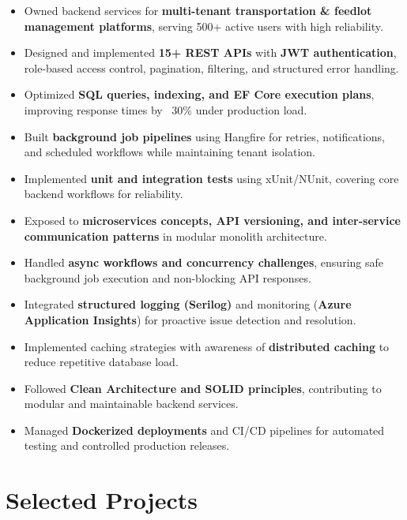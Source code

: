 \documentclass[a4paper,10pt]{article}
\newcommand{\resumeItem}[1]{\item #1}
\begin{document}
\begin{itemize}
    \resumeItem{Owned backend services for \textbf{multi-tenant transportation \& feedlot management platforms}, serving 500+ active users with high reliability.}
    \resumeItem{Designed and implemented \textbf{15+ REST APIs} with \textbf{JWT authentication}, role-based access control, pagination, filtering, and structured error handling.}
    \resumeItem{Optimized \textbf{SQL queries, indexing, and EF Core execution plans}, improving response times by ~30\% under production load.}
    \resumeItem{Built \textbf{background job pipelines} using Hangfire for retries, notifications, and scheduled workflows while maintaining tenant isolation.}
    \resumeItem{Implemented \textbf{unit and integration tests} using xUnit/NUnit, covering core backend workflows for reliability.}
    \resumeItem{Exposed to \textbf{microservices concepts, API versioning, and inter-service communication patterns} in modular monolith architecture.}
    \resumeItem{Handled \textbf{async workflows and concurrency challenges}, ensuring safe background job execution and non-blocking API responses.}
    \resumeItem{Integrated \textbf{structured logging (Serilog)} and monitoring (\textbf{Azure Application Insights}) for proactive issue detection and resolution.}
    \resumeItem{Implemented caching strategies with awareness of \textbf{distributed caching} to reduce repetitive database load.}
    \resumeItem{Followed \textbf{Clean Architecture and SOLID principles}, contributing to modular and maintainable backend services.}
    \resumeItem{Managed \textbf{Dockerized deployments} and CI/CD pipelines for automated testing and controlled production releases.}
\end{itemize}

\vspace{2mm}

\section*{Selected Projects}
\end{document}
